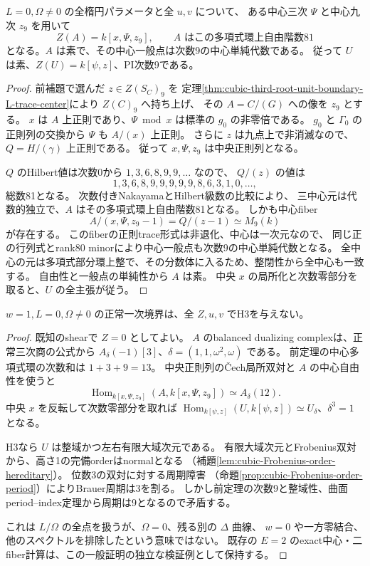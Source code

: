 \begin{theorem}
\label{thm:cubic-third-root-unit-boundary-L-all-center}
$L=0,\Omega\ne0$ の全楕円パラメータと全 $u,v$ について、
ある中心三次 $\Psi$ と中心九次 $z_9$ を用いて
\[
 Z(A)=k[x,\Psi,z_9],\qquad
 A\text{ はこの多項式環上自由階数81}
\]
となる。$A$ は素で、その中心一般点は次数9の中心単純代数である。
従って $U$ は素、$Z(U)=k[\psi,z]$、PI次数9である。
\end{theorem}
\begin{proof}
前補題で選んだ $z\in Z(S_C)_9$ を
定理\ref{thm:cubic-third-root-unit-boundary-L-trace-center}により $Z(C)_9$ へ持ち上げ、
その $A=C/(G)$ への像を $z_9$ とする。
$x$ は $A$ 上正則であり、$\Psi\bmod x$ は標準の $g_0$ の非零倍である。
$g_0$ と $\Gamma_0$ の正則列の交換から $\Psi$ も $A/(x)$ 上正則。
さらに $z$ は九点上で非消滅なので、$Q=H/(\gamma)$ 上正則である。
従って $x,\Psi,z_9$ は中央正則列となる。

$Q$ のHilbert値は次数0から $1,3,6,8,9,9,\ldots$ なので、
$Q/(z)$ の値は
\[
 1,3,6,8,9,9,9,9,9,8,6,3,1,0,\ldots,
\]
総数81となる。
次数付きNakayamaとHilbert級数の比較により、
三中心元は代数的独立で、$A$ はその多項式環上自由階数81となる。
しかも中心fiber
\[
 A/(x,\Psi,z_9-1)=Q/(z-1)\simeq M_9(k)
\]
が存在する。
このfiberの正則trace形式は非退化、中心は一次元なので、
同じ正の行列式とrank80 minorにより中心一般点も次数9の中心単純代数となる。
全中心の元は多項式部分環上整で、その分数体に入るため、整閉性から全中心も一致する。
自由性と一般点の単純性から $A$ は素。
中央 $x$ の局所化と次数零部分を取ると、$U$ の全主張が従う。
\end{proof}

\begin{theorem}[正常一次例外曲線の全開集合排除]
\label{thm:cubic-third-root-unit-boundary-L-all-no-H3}
$w=1,L=0,\Omega\ne0$ の正常一次境界は、全 $Z,u,v$ でH3を与えない。
\end{theorem}
\begin{proof}
既知のshearで $Z=0$ としてよい。
$A$ のbalanced dualizing complexは、正常三次商の公式から
$A_\delta(-1)[3]$、$\delta=(1,1,\omega^2,\omega)$ である。
前定理の中心多項式環の次数和は $1+3+9=13$。
中央正則列の\v Cech局所双対と $A$ の中心自由性を使うと
\[
 \operatorname{Hom}_{k[x,\Psi,z_9]}(A,k[x,\Psi,z_9])
   \simeq A_\delta(12).
\]
中央 $x$ を反転して次数零部分を取れば
$\operatorname{Hom}_{k[\psi,z]}(U,k[\psi,z])\simeq U_\delta$、$\delta^3=1$ となる。

H3なら $U$ は整域かつ左右有限大域次元である。
有限大域次元とFrobenius双対から、高さ1の完備orderはnormalとなる
（補題\ref{lem:cubic-Frobenius-order-hereditary}）。
位数3の双対に対する周期障害
（命題\ref{prop:cubic-Frobenius-order-period}）によりBrauer周期は3を割る。
しかし前定理の次数9と整域性、曲面period--index定理から周期は9となるので矛盾する。

これは $L/\Omega$ の全点を扱うが、$\Omega=0$、残る別の $\Delta$ 曲線、
$w=0$ や一方零結合、他のスペクトルを排除したという意味ではない。
既存の $E=2$ のexact中心・二fiber計算は、この一般証明の独立な検証例として保持する。
\end{proof}
